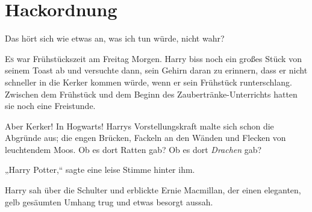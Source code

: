 \chapter{Hackordnung}

\begin{chapterOpeningAuthorNote}
\end{chapterOpeningAuthorNote}
\begin{chapterOpeningQuote}
Das hört sich wie etwas an, was ich tun würde, nicht wahr?
\end{chapterOpeningQuote}

\lettrine{E}{s} war Frühstückszeit am Freitag Morgen. Harry biss noch ein großes Stück von seinem Toast ab und versuchte dann, sein Gehirn daran zu erinnern, dass er nicht schneller in die Kerker kommen würde, wenn er sein Frühstück runterschlang. Zwischen dem Frühstück und dem Beginn des Zaubertränke-Unterrichts hatten sie noch eine Freistunde.

Aber Kerker! In Hogwarts! Harrys Vorstellungskraft malte sich schon die Abgründe aus; die engen Brücken, Fackeln an den Wänden und Flecken von leuchtendem Moos. Ob es dort Ratten gab? Ob es dort \emph{Drachen} gab?

„Harry Potter,“ sagte eine leise Stimme hinter ihm.

Harry sah über die Schulter und erblickte Ernie Macmillan, der einen eleganten, gelb gesäumten Umhang trug und etwas besorgt aussah.

